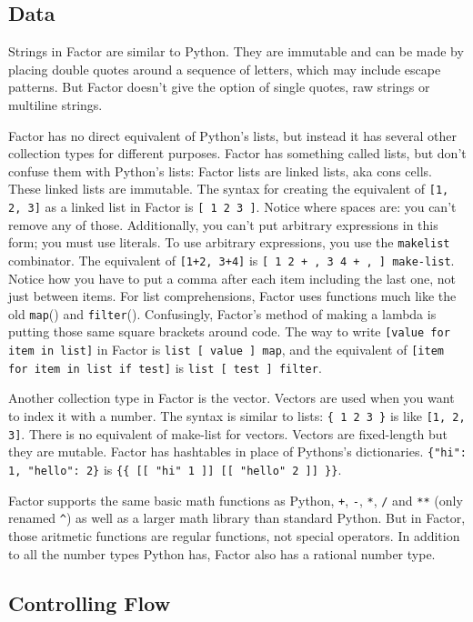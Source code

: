 \documentclass{article}
\begin{document}
\subsection{Data}

Strings in Factor are similar to Python. They are immutable and can be made by placing double quotes around a sequence of letters, which may include escape patterns. But Factor doesn't give the option of single quotes, raw strings or multiline strings.

Factor has no direct equivalent of Python's lists, but instead it has several other collection types for different purposes. Factor has something called lists, but don't confuse them with Python's lists: Factor lists are linked lists, aka cons cells. These linked lists are immutable. The syntax for creating the equivalent of \verb|[1, 2, 3]| as a linked list in Factor is \verb|[ 1 2 3 ]|. Notice where spaces are: you can't remove any of those. Additionally, you can't put arbitrary expressions in this form; you must use literals. To use arbitrary expressions, you use the \texttt{makelist} combinator. The equivalent of \verb|[1+2, 3+4]| is \verb|[ 1 2 + , 3 4 + , ] make-list|. Notice how you have to put a comma after each item including the last one, not just between items. For list comprehensions, Factor uses functions much like the old \texttt{map}() and \texttt{filter}(). Confusingly, Factor's method of making a lambda is putting those same square brackets around code. The way to write \verb|[value for item in list]| in Factor is \verb|list [ value ] map|, and the equivalent of \verb|[item for item in list if test]| is \verb|list [ test ] filter|.

Another collection type in Factor is the vector. Vectors are used when you want to index it with a number. The syntax is similar to lists: \verb|{ 1 2 3 }| is like \verb|[1, 2, 3]|. There is no equivalent of make-list for vectors. Vectors are fixed-length but they are mutable. Factor has hashtables in place of Pythons's dictionaries. \verb|{"hi": 1, "hello": 2}| is \verb|{{ [[ "hi" 1 ]] [[ "hello" 2 ]] }}|.

Factor supports the same basic math functions as Python, \texttt{+}, \texttt{-}, \texttt{*}, \texttt{/} and \texttt{**} (only renamed \texttt{\^{}}) as well as a larger math library than standard Python. But in Factor, those aritmetic functions are regular functions, not special operators. In addition to all the number types Python has, Factor also has a rational number type.

\subsection{Controlling Flow}
\end{document}
